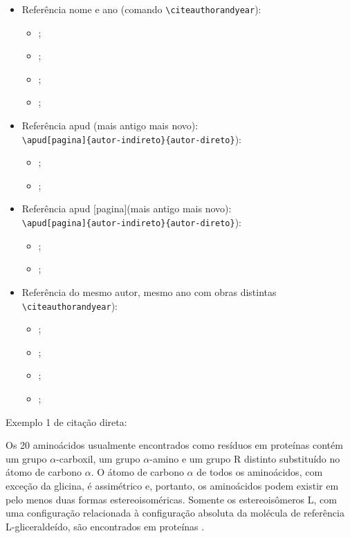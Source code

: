 \begin{itemize}
\begin{itemize}
		\item \cite{AgapitoTenfen2014, Baum2016, Nelson2014};
	\end{itemize}
	\item Referência nome e ano (comando \verb|\citeauthorandyear|):
	\begin{itemize}
		\item {};
		\item {};
		\item {};
		\item {};
	\end{itemize}
	\item Referência apud ({mais antigo} {mais novo}):\\
	\verb|\apud[pagina]{autor-indireto}{autor-direto}|):
	\begin{itemize}
		\item {};
		\item {};
	\end{itemize}
	\item Referência apud [pagina]({mais antigo} {mais novo}):\\
	\verb|\apud[pagina]{autor-indireto}{autor-direto}|):
	\begin{itemize}
		\item {};
		\item {};
	\end{itemize}
	
	\item Referência do mesmo autor, mesmo ano com obras distintas 
	\verb|\citeauthorandyear|):
	\begin{itemize}
		\item {};
		\item {};
		\item \cite{Agaisse1996a};
		\item \cite{Agaisse1996b};
	\end{itemize}
	
	
\end{itemize}


Exemplo 1 de citação direta:

\begin{citacao}
	Os 20 aminoácidos usualmente encontrados como resíduos em proteínas contém um grupo $\alpha$-carboxil, um grupo $\alpha$-amino e um grupo R distinto substituído no átomo de carbono $\alpha$. O átomo de carbono $\alpha$ de todos os aminoácidos, com exceção da glicina, é assimétrico e, portanto, os aminoácidos podem existir em pelo menos duas formas estereoisoméricas. Somente os estereoisômeros L, com uma configuração relacionada à configuração absoluta da molécula de referência L-gliceraldeído, são encontrados em proteínas \cite[p. 81]{Nelson2014}.
\end{citacao}

